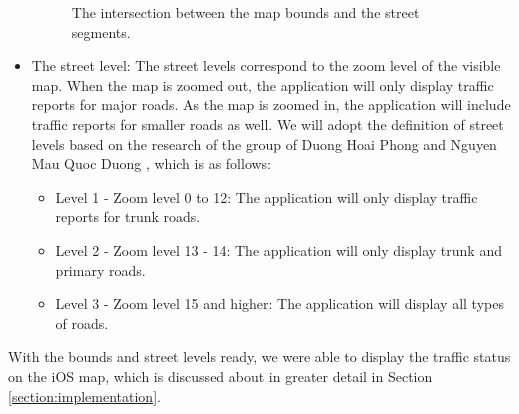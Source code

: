 \begin{itemize}
\begin{figure}[H]
        \caption{The intersection between the map bounds and the street segments.}
        \label{fig:intersetion_ne_sw_bounds}
    \end{figure}
    \item The street level: The street levels correspond to the zoom level of the visible map. When the map is zoomed out, the application will only display traffic reports for major roads. As the map is zoomed in, the application will include traffic reports for smaller roads as well. We will adopt the definition of street levels based on the research of the group of Duong Hoai Phong and Nguyen Mau Quoc Duong \cite{phong_duong}, which is as follows:
    \begin{itemize}
        \item Level 1 - Zoom level 0 to 12: The application will only display traffic reports for trunk roads.
        \item Level 2 - Zoom level 13 - 14: The application will only display trunk and primary roads.
        \item Level 3 - Zoom level 15 and higher: The application will display all types of roads.
    \end{itemize}
\end{itemize}

With the bounds and street levels ready, we were able to display the traffic status on the iOS map, which is discussed about in greater detail in Section \ref{section:implementation}.